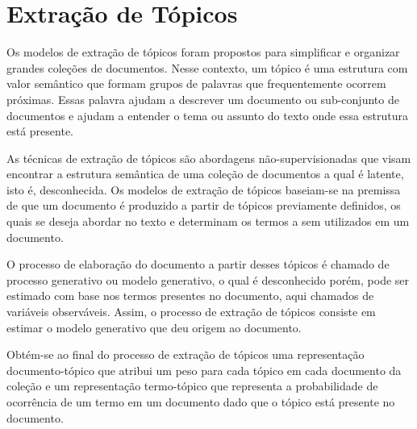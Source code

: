 \section{Extração de Tópicos}


Os modelos de extração de tópicos foram propostos para simplificar e organizar grandes coleções de documentos. Nesse contexto, um tópico é uma estrutura com valor semântico que formam grupos de palavras que frequentemente ocorrem próximas. Essas palavra ajudam a descrever um documento ou sub-conjunto de documentos e ajudam a entender o tema ou assunto do texto onde essa estrutura está presente.

As técnicas de extração de tópicos são abordagens não-supervisionadas que visam encontrar a estrutura semântica de uma coleção de documentos a qual é latente, isto é, desconhecida. Os modelos de extração de tópicos baseiam-se na premissa de que um documento é produzido a partir de tópicos previamente definidos, os quais se deseja abordar no texto e determinam os termos a sem utilizados em um documento.

O processo de elaboração do documento a partir desses tópicos é chamado de processo generativo ou modelo generativo, o qual é desconhecido porém, pode ser estimado  com base nos termos presentes no documento, aqui chamados de variáveis observáveis. Assim, o processo de extração de tópicos consiste em estimar o modelo generativo que deu origem ao documento.

Obtém-se ao final do processo de extração de tópicos uma representação documento-tópico que atribui um peso para cada tópico em cada documento da coleção e um representação termo-tópico que representa a probabilidade de ocorrência de um termo em um documento dado que o tópico está presente no documento.






